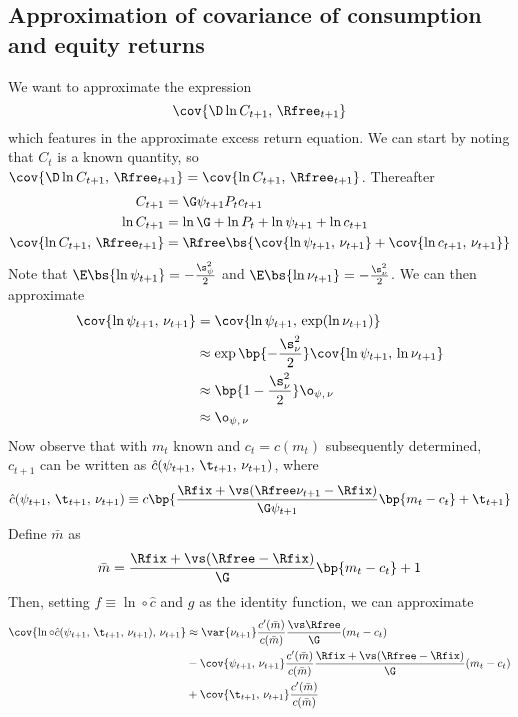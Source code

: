 \subsection{Approximation of covariance of consumption and equity returns}\label{app:cons_return_cov}

We want to approximate the expression
\[
\cov{\D\ln C_{t+1},\,\Rfree_{t+1}}
\]
which features in the approximate excess return equation. We can start by noting that $C_t$ is a known quantity, so $\cov{\D\ln C_{t+1},\,\Rfree_{t+1}} = \cov{\ln C_{t+1},\,\Rfree_{t+1}}$. Thereafter
\begin{align*}
    C_{t+1} &= \G\psi_{t+1}P_tc_{t+1}\\
    \ln C_{t+1} &= \ln \G + \ln P_t + \ln \psi_{t+1}+ \ln c_{t+1}\\
    \cov{\ln C_{t+1},\,\Rfree_{t+1}} &= \Rfree\bs{\cov{\ln \psi_{t+1},\,\nu_{t+1}} + \cov{\ln c_{t+1},\,\nu_{t+1}}}
\end{align*}
Note that $\E\bs{\ln \psi_{t+1}} = -\frac{\s_{\psi}^2}{2}$ and $\E\bs{\ln \nu_{t+1}} = -\frac{\s_{\nu}^2}{2}$. We can then approximate
\begin{align*}
    \cov{\ln \psi_{t+1},\,\nu_{t+1}} &= \cov{\ln \psi_{t+1},\,\exp(\ln \nu_{t+1})}\\
    &\approx \exp\bp{-\frac{\s_{\nu}^2}{2}}\cov{\ln \psi_{t+1},\,\ln \nu_{t+1}}\\
    &\approx \bp{1 - \frac{\s_{\nu}^2}{2}}\o_{\psi,\,\nu}\\
    &\approx \o_{\psi,\,\nu}
\end{align*}
Now observe that with $m_t$ known and $c_t = c(m_t)$ subsequently determined, $c_{t+1}$ can be written as $\hat{c}(\psi_{t+1},\,\t_{t+1},\,\nu_{t+1})$, where
\[
\hat{c}(\psi_{t+1},\,\t_{t+1},\,\nu_{t+1}) \equiv c\bp{\frac{\Rfix + \vs(\Rfree\nu_{t+1} - \Rfix)}{\G\psi_{t+1}}\bp{m_t - c_t} + \t_{t+1}}
\]
Define $\bar{m}$ as
\[
\bar{m} = \frac{\Rfix + \vs(\Rfree - \Rfix)}{\G}\bp{m_t - c_t} + 1
\]
Then, setting $f \equiv \ln \circ \hat{c}$ and $g$ as the identity function, we can approximate
\begin{align*}
    \cov{\ln \circ \hat{c}(\psi_{t+1},\,\t_{t+1},\,\nu_{t+1}),\,\nu_{t+1}} & \approx \var{\nu_{t+1}} \frac{c'(\bar{m})}{c(\bar{m})}\frac{\vs\Rfree}{\G}(m_t - c_t)\\
    &- \cov{\psi_{t+1},\,\nu_{t+1}}\frac{c'(\bar{m})}{c(\bar{m})}\frac{\Rfix + \vs(\Rfree - \Rfix)}{\G}(m_t - c_t)\\
    &+ \cov{\t_{t+1},\,\nu_{t+1}}\frac{c'(\bar{m})}{c(\bar{m})}
\end{align*}
